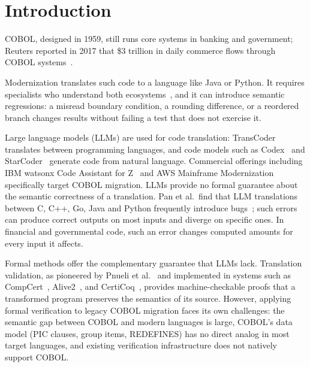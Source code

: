 \documentclass[sigconf,nonacm]{acmart}
\begin{document}


\maketitle


\section{Introduction}\label{sec:intro}

COBOL, designed in 1959, still runs core systems in banking and government; Reuters reported in 2017 that \$3 trillion in daily commerce flows through COBOL systems~\cite{reuters2017cobol}.

Modernization translates such code to a language like Java or Python. It requires specialists who understand both ecosystems~\cite{sneed2010automated}, and it can introduce semantic regressions: a misread boundary condition, a rounding difference, or a reordered branch changes results without failing a test that does not exercise it.

Large language models (LLMs) are used for code translation: TransCoder~\cite{roziere2020transcoder} translates between programming languages, and code models such as Codex~\cite{chen2021evaluating} and StarCoder~\cite{li2023starcoder} generate code from natural language. Commercial offerings including IBM watsonx Code Assistant for Z~\cite{ibm2024watsonx} and AWS Mainframe Modernization~\cite{aws2023mainframe} specifically target COBOL migration. LLMs provide no formal guarantee about the semantic correctness of a translation. Pan et al.\ find that LLM translations between C, C++, Go, Java and Python frequently introduce bugs~\cite{pan2024cobol}; such errors can produce correct outputs on most inputs and diverge on specific ones. In financial and governmental code, such an error changes computed amounts for every input it affects.

Formal methods offer the complementary guarantee that LLMs lack. Translation validation, as pioneered by Pnueli et al.~\cite{pnueli1998translation} and implemented in systems such as CompCert~\cite{leroy2009compcert}, Alive2~\cite{lopes2021alive2}, and CertiCoq~\cite{anand2017certicoq}, provides machine-checkable proofs that a transformed program preserves the semantics of its source. However, applying formal verification to legacy COBOL migration faces its own challenges: the semantic gap between COBOL and modern languages is large, COBOL's data model (PIC clauses, group items, REDEFINES) has no direct analog in most target languages, and existing verification infrastructure does not natively support COBOL.
\end{document}
